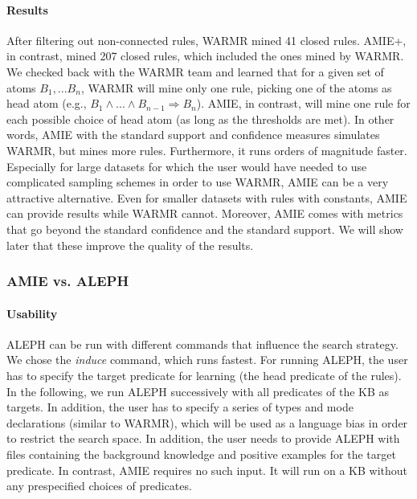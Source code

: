 {\paragraph{Results} After filtering out non-connected rules, WARMR mined 41 closed rules. AMIE+, in contrast, mined 207 closed rules, which included the ones mined by WARMR.
We checked back with the WARMR team and learned that for a given set of atoms $B_1, ... B_n$, WARMR will mine only one rule,
picking one of the atoms as head atom (e.g., $B_1 \wedge ... \wedge B_{n-1} \Rightarrow B_n$).
AMIE, in contrast, will mine one rule for each possible choice of head atom (as long as the thresholds are met).
In other words, AMIE with the standard support and confidence measures simulates WARMR, but mines more rules.
Furthermore, it runs orders of magnitude faster. Especially for large datasets for which the user would have needed to use complicated sampling schemes in order to use WARMR,
AMIE can be a very attractive alternative.
Even for smaller datasets with rules with constants, AMIE can provide results while WARMR cannot.
Moreover, AMIE comes with metrics that go beyond the standard confidence and the standard support.
We will show later that these improve the quality of the results.


\subsubsection{AMIE vs. ALEPH}

\paragraph{Usability} ALEPH can be run with different commands that influence the search strategy. We chose the \emph{induce} command, which runs fastest.
For running ALEPH, the user has to specify the target predicate for learning (the head predicate of the rules).
In the following, we run ALEPH successively with all predicates of the KB as targets.
In addition, the user has to specify a series of types and mode declarations (similar to WARMR), which will be used as a language bias in order to restrict the search space.
In addition, the user needs to provide ALEPH with files containing the background knowledge and positive examples for the target predicate.
In contrast, AMIE requires no such input. It will run on a KB without any prespecified choices of predicates.


}
